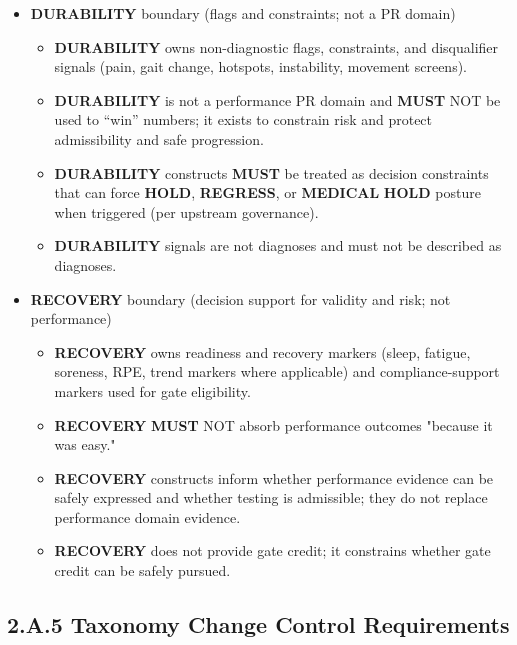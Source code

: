 \documentclass[10pt]{article}
\begin{document}
\begin{itemize}
\item \textbf{DURABILITY} boundary (flags and constraints; not a PR domain)

  \begin{itemize}
  \item \textbf{DURABILITY} owns non-diagnostic flags, constraints, and disqualifier signals (pain, gait change, hotspots, instability, movement screens).
  \item \textbf{DURABILITY} is not a performance PR domain and \textbf{MUST} NOT be used to “win” numbers; it exists to constrain risk and protect admissibility and safe progression.
  \item \textbf{DURABILITY} constructs \textbf{MUST} be treated as decision constraints that can force \textbf{HOLD}, \textbf{REGRESS}, or \textbf{MEDICAL} \textbf{HOLD} posture when triggered (per upstream governance).
  \item \textbf{DURABILITY} signals are not diagnoses and must not be described as diagnoses.
  \end{itemize}

\item \textbf{RECOVERY} boundary (decision support for validity and risk; not performance)

  \begin{itemize}
  \item \textbf{RECOVERY} owns readiness and recovery markers (sleep, fatigue, soreness, RPE, trend markers where applicable) and compliance-support markers used for gate eligibility.
  \item \textbf{RECOVERY} \textbf{MUST} NOT absorb performance outcomes "because it was easy."
  \item \textbf{RECOVERY} constructs inform whether performance evidence can be safely expressed and whether testing is admissible; they do not replace performance domain evidence.
  \item \textbf{RECOVERY} does not provide gate credit; it constrains whether gate credit can be safely pursued.
  \end{itemize}
\end{itemize}

\newpage

\subsection*{2.A.5 Taxonomy Change Control Requirements}
{}
\end{document}
